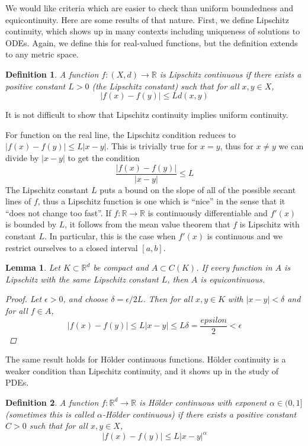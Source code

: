 \documentclass[12pt]{amsart}         %
\newtheorem{definition}{Definition}[section]
\newtheorem{lemma}{Lemma}[section]
\theoremstyle{remark}
\newcommand{\R}{\mathbb{R}}
\begin{document}
We would like criteria which are easier to check than uniform boundedness and equicontinuity. Here are some results of that nature. First, we define Lipschitz continuity, which shows up in many contexts including uniqueness of solutions to ODEs. Again, we define this for real-valued functions, but the definition extends to any metric space.

\begin{definition}
A function $f: (X, d) \rightarrow \R$ is \emph{Lipschitz continuous} if there exists a positive constant $L > 0$ (the Lipschitz constant) such that for all $x, y \in X$,
\[
|f(x) - f(y)| \leq L d(x, y)
\]
\end{definition}
It is not difficult to show that Lipschitz continuity implies uniform continuity.

For function on the real line, the Lipschitz condition reduces to $|f(x) - f(y)| \leq L|x-y|$. This is trivially true for $x = y$, thus for $x \neq y$ we can divide by $|x - y|$ to get the condition
\[
\frac{|f(x) - f(y)|}{|x-y|} \leq L
\]
The Lipschitz constant $L$ puts a bound on the slope of all of the possible secant lines of $f$, thus a Lipschitz function is one which is ``nice'' in the sense that it ``does not change too fast''. If $f: \R \rightarrow \R$ is continuously differentiable and $f'(x)$ is bounded by $L$, it follows from the mean value theorem that $f$ is Lipschitz with constant $L$. In particular, this is the case when $f'(x)$ is continuous and we restrict ourselves to a closed interval $[a, b]$. 

\begin{lemma}
Let $K \subset \R^d$ be compact and $A \subset C(K)$. If every function in $A$ is Lipschitz with the same Lipschitz constant $L$, then $A$ is equicontinuous.
\begin{proof}
Let $\epsilon > 0$, and choose $\delta = \epsilon/2L$. Then for all $x, y \in K$ with $|x-y| < \delta$ and for all $f \in A$,
\[
|f(x) - f(y)| \leq L|x-y| \leq L\delta = \frac{epsilon}{2} < \epsilon
\]
\end{proof}
\end{lemma}

The same result holds for H\"{o}lder continuous functions. H\"{o}lder continuity is a weaker condition than Lipschitz continuity, and it shows up in the study of PDEs.

\begin{definition}
A function $f: \R^d \rightarrow \R$ is \emph{H\"{o}lder continuous} with exponent $\alpha \in (0, 1]$ (sometimes this is called $\alpha$-H\"{o}lder continuous) if there exists a positive constant $C > 0$ such that for all $x, y \in X$,
\[
|f(x) - f(y)| \leq L |x - y|^\alpha
\]
\end{definition}
\end{document}

